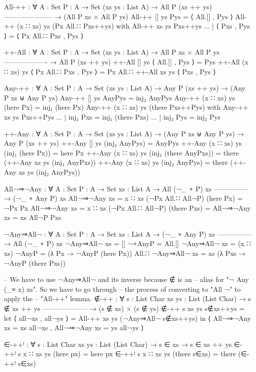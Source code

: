 \begin{code}
  All-++ : ∀ {A : Set} {P : A → Set} (xs ys : List A)
    → All P (xs ++ ys)
      ---------------------
    → (All P xs × All P ys)
  All-++ [] ys Pys = ⟨ All.[] , Pys ⟩
  All-++ (x ∷ xs) ys (Px All.∷ Pxs++ys) with All-++ xs ys Pxs++ys
  ... | ⟨ Pxs , Pys ⟩ = ⟨ Px All.∷ Pxs , Pys ⟩

  ++-All : ∀ {A : Set} {P : A → Set} (xs ys : List A)
    → All P xs × All P ys
      -------------------
    → All P (xs ++ ys)
  ++-All [] ys ⟨ All.[] , Pys ⟩ = Pys
  ++-All (x ∷ xs) ys ⟨ Px All.∷ Pxs , Pys ⟩ =
    Px All.∷ ++-All xs ys ⟨ Pxs , Pys ⟩

  Any-++ : ∀ {A : Set} {P : A → Set} (xs ys : List A)
    → Any P (xs ++ ys) → (Any P xs ⊎ Any P ys)
  Any-++ [] ys AnyPys = inj₂ AnyPys
  Any-++ (x ∷ xs) ys (here Px) = inj₁ (here Px)
  Any-++ (x ∷ xs) ys (there Pxs++Pys) with Any-++ xs ys Pxs++Pys
  ... | inj₁ Pxs = inj₁ (there Pxs)
  ... | inj₂ Pys = inj₂ Pys

  ++-Any : ∀ {A : Set} {P : A → Set} (xs ys : List A)
    → (Any P xs ⊎ Any P ys) → Any P (xs ++ ys)
  ++-Any [] ys (inj₂ AnyPys) = AnyPys
  ++-Any (x ∷ xs) ys (inj₁ (here Px)) = here Px
  ++-Any (x ∷ xs) ys (inj₁ (there AnyPxs)) =
    there (++-Any xs ys (inj₁ AnyPxs))
  ++-Any (x ∷ xs) ys (inj₂ AnyPys) =
    there (++-Any xs ys (inj₂ AnyPys))

  All¬⇒¬Any : ∀ {A : Set} {P : A → Set} {xs : List A}
    → All (¬_ ∘ P) xs
      ---------------
    → (¬_ ∘ Any P) xs
  All¬⇒¬Any {xs = x ∷ xs} (¬Px All.∷ All¬P) (here Px) = ¬Px Px
  All¬⇒¬Any {xs = x ∷ xs} (¬Px All.∷ All¬P) (there Pxs) =
    All¬⇒¬Any {xs = xs} All¬P Pxs

  ¬Any⇒All¬ : ∀ {A : Set} {P : A → Set} {xs : List A}
    → (¬_ ∘ Any P) xs
      ---------------
    → All (¬_ ∘ P) xs
  ¬Any⇒All¬ {xs = []} ¬∘AnyP = All.[]
  ¬Any⇒All¬ {xs = (x ∷ xs)} ¬AnyP =
    (λ Px → ¬AnyP (here Px))
      All.∷ ¬Any⇒All¬ {xs = xs} (λ Pxs → ¬AnyP (there Pxs))

  -- We have to use ¬Any⇒All¬ and its inverse because ∉ is an
  -- alias for "¬ Any (_≡ x) xs".  So we have to go through
  -- the process of converting to "All ¬" to apply the
  -- "All-++" lemma.
  ∉-++ : ∀ {s : List Char} {xs ys : List (List Char)}
    → s ∉ xs ++ ys
      --------------------
    → (s ∉ xs) × (s ∉ ys)
  ∉-++ {s} {xs} {ys} s∉xs++ys =
    let ⟨ all¬xs , all¬ys ⟩ = All-++ xs ys (¬Any⇒All¬ s∉xs++ys) in
      ⟨ All¬⇒¬Any {xs = xs} all¬xs
      , All¬⇒¬Any {xs = ys} all¬ys ⟩

  ∈-++ˡ : ∀ {s : List Char} {xs ys : List (List Char)}
    → s ∈ xs
    → s ∈ xs ++ ys
  ∈-++ˡ {s} {x ∷ xs} {ys} (here px) = here px
  ∈-++ˡ {s} {x ∷ xs} {ys} (there s∈xs) = there (∈-++ˡ s∈xs)


\end{code}
